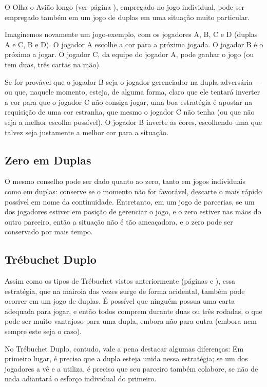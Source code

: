 O Olha o Avião longo (ver página \pageref{aviaolongo}), empregado no jogo individual, pode ser empregado também em um jogo de duplas em uma situação muito particular.

Imaginemos novamente um jogo-exemplo, com os jogadores A, B, C e D (duplas A e C, B e D). O jogador A escolhe a cor para a próxima jogada. O jogador B é o próximo a jogar. O jogador C, da equipe do jogador A, pode ganhar o jogo (ou tem duas, três cartas na mão).

Se for provável que o jogador B seja o jogador gerenciador na dupla adversária --- ou que, naquele momento, esteja, de alguma forma, claro que ele tentará inverter a cor para que o jogador C não consiga jogar, uma boa estratégia é apostar na requisição de uma cor estranha, que mesmo o jogador C não tenha (ou que não seja a melhor escolha possível). O jogador B inverte as cores, escolhendo uma que talvez seja justamente a melhor cor para a situação.

\subsection{Zero em Duplas}

O mesmo conselho pode ser dado quanto ao zero, tanto em jogos individuais como em duplas: conserve se o momento não for favorável, descarte o mais rápido possível em nome da continuidade. Entretanto, em um jogo de parcerias, se um dos jogadores estiver em posição de gerenciar o jogo, e o zero estiver nas mãos do outro parceiro, então a situação não é tão ameaçadora, e o zero pode ser conservado por mais tempo. 

\subsection{Trébuchet Duplo}

\label{trebuchetduplo}

Assim como os tipos de Trébuchet vistos anteriormente (páginas \pageref{trebuchetlongo} e \pageref{trebuchetcurto}), essa estratégia, que na mairoia das vezes surge de forma acidental, também pode ocorrer em um jogo de duplas. É possível que ninguém possua uma carta adequada para jogar, e então todos comprem durante duas ou três rodadas, o que pode ser muito vantajoso para uma dupla, embora não para outra (embora nem sempre este seja o caso).

No Trébuchet Duplo, contudo, vale a pena destacar algumas diferenças: Em primeiro lugar, é preciso que a dupla esteja unida nessa estratégia; se um dos jogadores a vê e a utiliza, é preciso que seu parceiro também colabore, se não de nada adiantará o esforço individual do primeiro.

